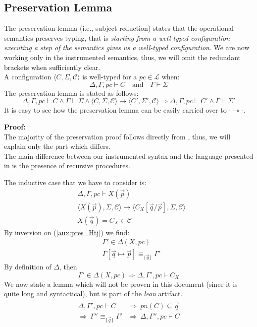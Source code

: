 \documentclass[12pt,a4paper,twoside]{book}
\newcommand{\MCL}{\mathscr{L}}
\begin{document}
\subsection{Preservation Lemma}
The preservation lemma (i.e., subject reduction) states that the operational semantics preserves typing, that is \emph{starting from a well-typed configuration executing a step of the semantics gives us a well-typed configuration}.
We are now working only in the instrumented semantics, thus, we will omit the redundant brackets when sufficiently clear.\\
A configuration
$\langle C, \Sigma, \mathscr{C}\rangle$ is well-typed for a $pc \in \MCL$ when:
$$\Delta, \Gamma, pc \vdash C \quad \text{and}\quad \Gamma \vdash \Sigma$$
The preservation lemma is stated as follows:
\begin{equation}\label{aux:pres}
\Delta, \Gamma, pc \vdash C \land \Gamma \vdash \Sigma \land 
\langle C, \Sigma, \mathscr{C}\rangle \rightarrow
\langle C', \Sigma', \mathscr{C}\rangle \Rightarrow 
\Delta, \Gamma, pc \vdash C' \land \Gamma \vdash \Sigma'
\end{equation}
It is easy to see how the preservation lemma can be easily carried over to $\cdot \twoheadrightarrow \cdot$.

\medskip
\noindent\textbf{Proof:}\\
The majority of the preservation proof follows directly from \cite{myers2011proving}, thus, we will explain only the part which differs.\\
The main difference between our instrumented syntax and the language presented in \cite{myers2011proving} is the presence of recursive procedures.

The inductive case that we have to consider is:
\begin{align}
	&\Delta,\Gamma,pc \vdash X(\vec{p})\label{aux:pres_Htj}\tag{H1}\\
	&\langle X(\vec{p}), \Sigma, \mathscr{C}\rangle \rightarrow
	\langle C_X[\vec{q}/\vec{p}], \Sigma, \mathscr{C}\rangle\label{aux:pres_Hlto}\tag{H2}\\
	&X(\vec{q}) = C_X \in \mathscr{C}\label{aux:pres_Hlook}\tag{H3}
\end{align}
By inversion on (\ref{aux:pres_Htj}) we find:
\begin{align}
	&\Gamma' \in \Delta(X,pc) \label{aux:pres_Htj1}\tag{H11}\\
	&\Gamma[\vec{q}\mapsto \vec{p}] \equiv_{\{\vec{q}\}} \Gamma'\label{aux:pres_Htj2}\tag{H12}
\end{align}
By definition of $\Delta$, then
$$
\Gamma' \in \Delta(X,pc) \Rightarrow \Delta, \Gamma', pc \vdash C_X
$$
We now state a lemma which will not be proven in this document (since it is quite long and syntactical), but is part of the \emph{lean} artifact.
\begin{align*}\label{aux:pres_lemma2}
\begin{split}
	\Delta, \Gamma', pc \vdash C 
	&\Rightarrow~ pn(C) \subseteq \vec{q}\\
	\Rightarrow~ \Gamma'' \equiv_{\{\vec{q}\}} \Gamma'
	&\Rightarrow~ \Delta, \Gamma'', pc \vdash C
\end{split}
\end{align*}
\end{document}
